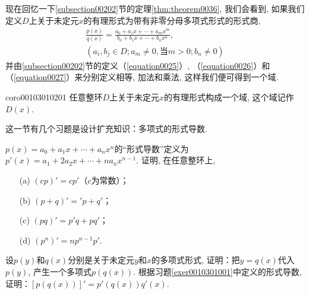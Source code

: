 现在回忆一下\ref{subsection00202}节的定理\ref{thm:theorem0036}, 我们会看到, 如果我们定义$D$上关于未定元$x$的有理形式为带有非零分母多项式形式的形式商, 
\begin{gather*}
\frac{p(x)}{q(x)} = \frac{a_0+a_1x+\cdots+a_mx^m}{b_0+b_1x+\cdots+b_nx^n}, \\
(a_i, b_j \in D; a_m \neq 0, \text{当}m>0; b_n \neq 0)
\end{gather*}
并由\ref{subsection00202}节的定义（\ref{equation0025}）, （\ref{equation0026}）和（\ref{equation0027}）来分别定义相等, 加法和乘法, 这样我们便可得到一个域. 
\begin{corollary}{}{coro00103010201}
任意整环$D$上关于未定元$x$的有理形式构成一个域, 这个域记作$D(x)$. 
\end{corollary}

这一节有几个习题是设计扩充知识：多项式的形式导数. 
\begin{exercise}\label{exer0010301001}
$p(x)=a_0+a_1x+\cdots+a_nx^n$的“形式导数”定义为$p'(x)=a_1+2a_2x+\cdots+na_nx^{n-1}$. 证明, 在任意整环上, 
\begin{enumerate}
\item[(a)] $(cp)'=cp'$（$c$为常数）；
\item[(b)] $(p+q)'='p+q'$；
\item[(c)] $(pq)'=p'q+pq'$；
\item[(d)] $(p^n)'=np^{n-1}p'$. 
\end{enumerate}
\end{exercise}
\begin{exercise}\label{exer0010301002}
设$p(y)$和$q(x)$分别是关于未定元$y$和$x$的多项式形式, 证明：把$y=q(x)$代入$p(y)$, 产生一个多项式$p(q(x))$. 根据习题\ref{exer0010301001}中定义的形式导数, 证明：$[p(q(x))]'=p'(q(x))q'(x)$. 
\end{exercise}




